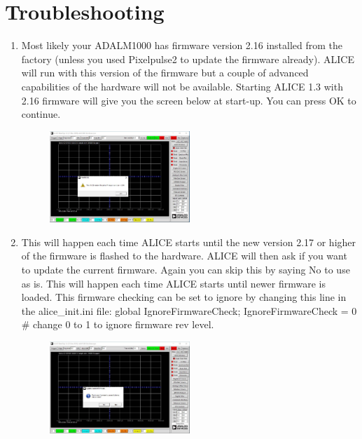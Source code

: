 \documentclass[12pt]{../manual}
\begin{document}
\newpage
\section{Troubleshooting}
\begin{enumerate}
\item Most likely your ADALM1000 has firmware version 2.16 installed from the factory (unless you used Pixelpulse2 to update the firmware already). ALICE will run with this version of the firmware but a couple of advanced capabilities of the hardware will not be available. Starting ALICE 1.3 with 2.16 firmware will give you the screen below at start-up. You can press OK to continue. 
\begin{figure}[!ht]
\begin{center}
\includegraphics[width=0.5\textwidth]{figures/Troubleshooting1}
\end{center}
\end{figure}
\item This will happen each time ALICE starts until the new version 2.17 or higher of the firmware is flashed to the hardware. ALICE will then ask if you want to update the current firmware. Again you can skip this by saying No to use as is. This will happen each time ALICE starts until newer firmware is loaded. This firmware checking can be set to ignore by changing this line in the alice\_init.ini file:
global IgnoreFirmwareCheck; IgnoreFirmwareCheck = 0 \# change 0 to 1 to ignore firmware rev level.
\begin{figure}[!ht]
\begin{center}
\includegraphics[width=0.5\textwidth]{figures/Troubleshooting2}
\end{center}

\end{figure}
\end{enumerate}
\end{document}
